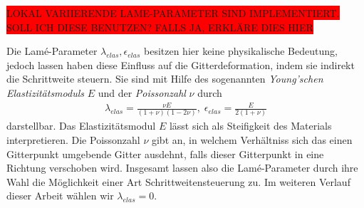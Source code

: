 \colorbox{red}{LOKAL VARIIERENDE LAME-PARAMETER SIND IMPLEMENTIERT. SOLL ICH DIESE BENUTZEN? FALLS JA, ERKLÄRE DIES HIER}

Die Lamé-Parameter $\lambda_{elas}, \epsilon_{elas}$ besitzen hier keine physikalische Bedeutung, jedoch lassen haben diese Einfluss auf die Gitterdeformation, indem sie indirekt die Schrittweite steuern. Sie sind mit Hilfe des sogenannten \textit{Young'schen Elastizitätsmoduls} $E$ und der \textit{Poissonzahl} $\nu$ durch
\begin{align*}
	\lambda_{elas} = \frac{\nu E}{(1+\nu)(1-2\nu)}, \; 
	\epsilon_{elas} = \frac{E}{2(1+\nu)}
\end{align*}
darstellbar. Das Elastizitätsmodul $E$ lässt sich als Steifigkeit des Materials interpretieren. Die Poissonzahl $\nu$ gibt an, in welchem Verhältniss sich das einen Gitterpunkt umgebende Gitter ausdehnt, falls dieser Gitterpunkt in eine Richtung verschoben wird. Insgesamt lassen also die Lamé-Parameter durch ihre Wahl die Möglichkeit einer Art Schrittweitensteuerung zu. Im weiteren Verlauf dieser Arbeit wählen wir $\lambda_{elas} = 0$.

